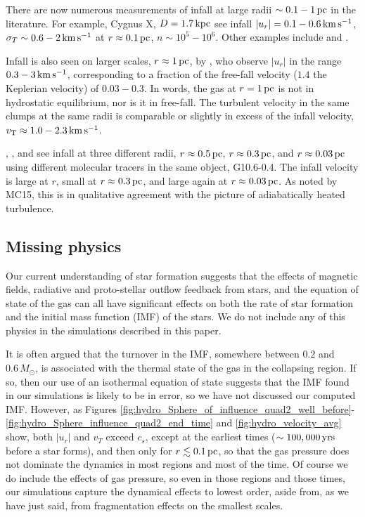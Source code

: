 \documentclass[../dissertation.tex]{subfiles}
\begin{document}
There are now numerous measurements of infall at large radii $\sim 0.1-1\,\rm pc$ 
in the literature. For example, \citet{2011A&A...527A.135C} Cygnus X, 
$D=1.7\,\rm kpc$ see infall $|u_r|=0.1-0.6\,\rm km\,s^{-1}$, $\sigma_T\sim 0.6-2\,\rm km\,s^{-1}$ at  
$r\approx 0.1\,\rm pc$, $n\sim 10^5-10^6$. Other examples include \citet{2012ApJ...746..174R,2015A&A...573A.119R} and 
\citet{2013A&A...555A.112P}. 

Infall is also seen on larger scales, $r\approx1\,\rm pc$, by \citet{2016A&A...585A.149W}, who observe $|u_r|$ in the range $0.3-3\,\rm km\,s^{-1}$, corresponding to a fraction of the free-fall velocity ($1.4$ the Keplerian velocity) of $0.03-0.3$. In words, the gas at $r=1\,\rm pc$ is not in hydrostatic equilibrium, nor is it in free-fall. The turbulent velocity in the same clumps at the same radii is comparable or slightly in excess of the infall velocity, $v_{\rm T}\approx 1.0-2.3\,\rm km\,s^{-1}$.

\citet{1986ApJ...304..501H}, \citet{2008ApJ...684.1273K}, and 
\citet{2011A&A...530A..53K} see infall at three different radii, 
$r\approx 0.5\,\rm pc$, $r\approx 0.3\,\rm pc$, and $r\approx 0.03\,\rm pc$ using 
different molecular tracers in the same object, G10.6-0.4. The infall velocity
is large at $r$, small at $r\approx 0.3\,\rm pc$, and large again at $r\approx 0.03\,\rm pc$. 
As noted by MC15, this is in qualitative agreement with the
picture of adiabatically heated turbulence. 


%
\subsection{Missing physics}
Our current understanding of star formation suggests that the effects of magnetic 
fields, radiative and proto-stellar outflow feedback from stars, and the equation 
of state of the gas can 
all have significant effects on both the rate of star formation and the initial 
mass function (IMF) of the stars. We do not include any of this physics in the simulations
described in this paper. 

It is often argued that the turnover in the IMF, somewhere between $0.2$ and
 $0.6\,M_\odot$, is associated with the thermal state of the gas in the collapsing
region. If so, then our use of an isothermal equation of state suggests that the IMF found in our simulations is likely to be in error, so we have not discussed our computed IMF. However, as Figures \ref{fig:hydro_Sphere_of_influence_quad2_well_before}-\ref{fig:hydro_Sphere_influence_quad2_end_time} and \ref{fig:hydro_velocity_avg} show, both $|u_r|$ and $v_T$ exceed $c_s$, except at the earliest times ($\sim 100,000\,\rm yrs$ before a star forms), and then only for $r\lesssim0.1\,\rm pc$, so that the gas pressure does not dominate the dynamics in most regions and most of the time. Of course we do include the effects of gas pressure, so even in those regions and those times, our simulations capture the dynamical effects to lowest order, aside from, as we have just said, from fragmentation effects on the smallest scales. 
\end{document}
